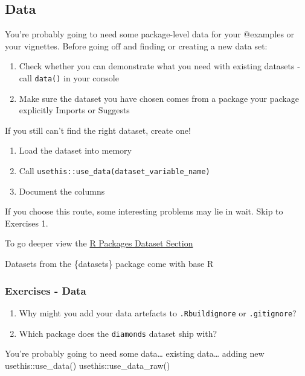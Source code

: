 \documentclass[
  letterpaper,
  DIV=11,
  numbers=noendperiod]{scrreprt}
\providecommand{\tightlist}{%
  \setlength{\itemsep}{0pt}\setlength{\parskip}{0pt}}\usepackage{longtable,booktabs,array}
\begin{document}
\subsection{Data}\label{data-1}

You're probably going to need some package-level data for your @examples
or your vignettes. Before going off and finding or creating a new data
set:

\begin{enumerate}
\def\labelenumi{\arabic{enumi}.}
\tightlist
\item
  Check whether you can demonstrate what you need with existing datasets
  - call \texttt{data()} in your console
\item
  Make sure the dataset you have chosen comes from a package your
  package explicitly Imports or Suggests
\end{enumerate}

If you still can't find the right dataset, create one!

\begin{enumerate}
\def\labelenumi{\arabic{enumi}.}
\tightlist
\item
  Load the dataset into memory
\item
  Call \texttt{usethis::use\_data(dataset\_variable\_name)}
\item
  Document the columns
\end{enumerate}

If you choose this route, some interesting problems may lie in wait.
Skip to Exercises 1.

To go deeper view the \href{https://r-pkgs.org/data.html}{R Packages
Dataset Section}

Datasets from the \{datasets\} package come with base R

\subsubsection{Exercises - Data}\label{exercises---data}

\begin{enumerate}
\def\labelenumi{\arabic{enumi}.}
\tightlist
\item
  Why might you add your data artefacts to \texttt{.Rbuildignore} or
  \texttt{.gitignore}?
\item
  Which package does the \texttt{diamonds} dataset ship with?
\end{enumerate}

You're probably going to need some data\ldots{} existing data\ldots{}
adding new usethis::use\_data() usethis::use\_data\_raw()
\end{document}
